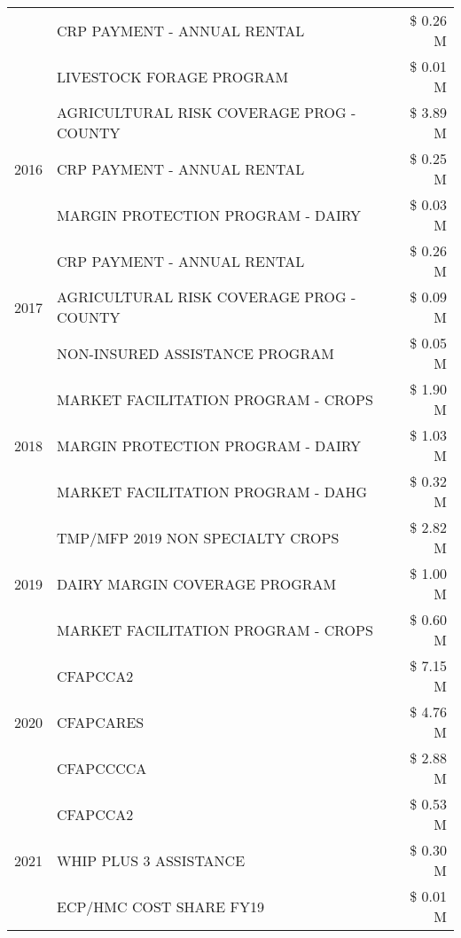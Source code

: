 \begin{tabular}{llr}
 & CRP PAYMENT - ANNUAL RENTAL & \$ 0.26 M \\
 & LIVESTOCK FORAGE PROGRAM & \$ 0.01 M \\
\cline{1-3}
\multirow[t]{3}{*}{2016} & AGRICULTURAL RISK COVERAGE PROG - COUNTY & \$ 3.89 M \\
 & CRP PAYMENT - ANNUAL RENTAL & \$ 0.25 M \\
 & MARGIN PROTECTION PROGRAM - DAIRY & \$ 0.03 M \\
\cline{1-3}
\multirow[t]{3}{*}{2017} & CRP PAYMENT - ANNUAL RENTAL & \$ 0.26 M \\
 & AGRICULTURAL RISK COVERAGE PROG - COUNTY & \$ 0.09 M \\
 & NON-INSURED ASSISTANCE PROGRAM & \$ 0.05 M \\
\cline{1-3}
\multirow[t]{3}{*}{2018} & MARKET FACILITATION PROGRAM - CROPS & \$ 1.90 M \\
 & MARGIN PROTECTION PROGRAM - DAIRY & \$ 1.03 M \\
 & MARKET FACILITATION PROGRAM - DAHG & \$ 0.32 M \\
\cline{1-3}
\multirow[t]{3}{*}{2019} & TMP/MFP 2019 NON SPECIALTY CROPS & \$ 2.82 M \\
 & DAIRY MARGIN COVERAGE PROGRAM & \$ 1.00 M \\
 & MARKET FACILITATION PROGRAM - CROPS & \$ 0.60 M \\
\cline{1-3}
\multirow[t]{3}{*}{2020} & CFAPCCA2 & \$ 7.15 M \\
 & CFAPCARES & \$ 4.76 M \\
 & CFAPCCCCA & \$ 2.88 M \\
\cline{1-3}
\multirow[t]{3}{*}{2021} & CFAPCCA2 & \$ 0.53 M \\
 & WHIP PLUS 3 ASSISTANCE & \$ 0.30 M \\
 & ECP/HMC COST SHARE FY19 & \$ 0.01 M \\
\cline{1-3}
\bottomrule
\end{tabular}
